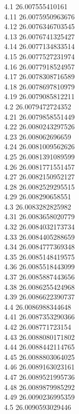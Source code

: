 {4.1	26.007555410161\\
4.11	26.0075950963676\\
4.12	26.0076346703545\\
4.13	26.0076741325427\\
4.14	26.0077134833514\\
4.15	26.0077527231974\\
4.16	26.0077918524957\\
4.17	26.0078308716589\\
4.18	26.0078697810979\\
4.19	26.0079085812211\\
4.2	26.0079472724352\\
4.21	26.0079858551449\\
4.22	26.0080243297526\\
4.23	26.008062696659\\
4.24	26.0081009562626\\
4.25	26.0081391089599\\
4.26	26.0081771551457\\
4.27	26.0082150952127\\
4.28	26.0082529295515\\
4.29	26.008290658551\\
4.3	26.0083282825982\\
4.31	26.0083658020779\\
4.32	26.0084032173734\\
4.33	26.0084405288659\\
4.34	26.0084777369348\\
4.35	26.0085148419575\\
4.36	26.0085518443099\\
4.37	26.0085887443656\\
4.38	26.0086255424968\\
4.39	26.0086622390737\\
4.4	26.0086988344648\\
4.41	26.0087353290366\\
4.42	26.008771723154\\
4.43	26.0088080171802\\
4.44	26.0088442114765\\
4.45	26.0088803064025\\
4.46	26.0089163023161\\
4.47	26.0089521995736\\
4.48	26.0089879985292\\
4.49	26.0090236995359\\
4.5	26.0090593029446\\
}
